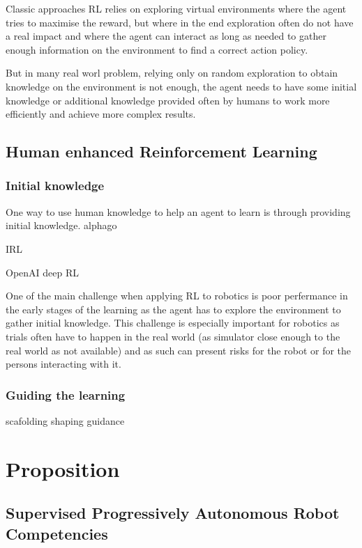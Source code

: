 \documentclass[letterpaper]{article} %
\begin{document}
Classic approaches RL relies on exploring virtual environments where the agent
tries to maximise the reward, but where in the end exploration often do not
have a real impact and where the agent can interact as long as needed to gather
enough information on the environment to find a correct action policy.

But in many real worl problem, relying only on random exploration to obtain
knowledge on the environment is not enough, the agent needs to have some initial
knowledge or additional knowledge provided often by humans to  work more
efficiently and achieve more complex results.

\subsection{Human enhanced Reinforcement Learning}
\subsubsection{Initial knowledge}
One way to use human knowledge to help an agent to learn is through providing
initial knowledge. 
alphago

IRL

OpenAI deep RL

One of the main challenge when applying RL to robotics is poor perfermance in
the early stages of the learning as the agent has to explore the environment to
gather initial knowledge. This challenge is especially
important for robotics as trials often have to happen in the real world (as
simulator close enough to the real world as not available) and as such can
present risks for the robot or for the persons interacting with it. 

\subsubsection{Guiding the learning}
scafolding 
shaping
guidance


\section{Proposition}
\subsection{Supervised Progressively Autonomous Robot Competencies}
\end{document}
